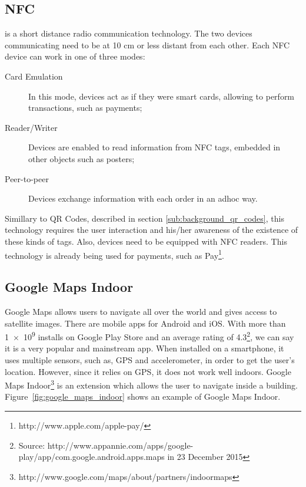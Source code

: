 \subsection{NFC}
\label{sub:background_near_field _communication}
 is a short distance radio communication technology.
The two devices communicating need to be at 10 cm or less distant from each other.
Each \gls{NFC} device can work in one of three modes:
\begin{description}
  \item[Card Emulation] In this mode, devices act as if they were smart cards, allowing to perform transactions, such as payments;
  \item[Reader/Writer] Devices are enabled to read information from \gls{NFC} tags, embedded in other objects such as posters;
  \item[Peer-to-peer] Devices exchange information with each order in an adhoc way.
\end{description}

Simillary to \gls{QR} Codes, described in section \ref{sub:background_qr_codes}, this technology requires the user interaction and his/her awareness of the existence of these kinds of tags.
Also, devices need to be equipped with \gls{NFC} readers.
This technology is already being used for payments, such as  Pay\footnote{http://www.apple.com/apple-pay/}.

\subsection{Google Maps Indoor}
\label{sub:background_google_maps_indoor}
Google Maps allows users to navigate all over the world and gives access to satellite images.
There are mobile apps for Android and iOS.
With more than \num{1e9} installs on Google Play Store and an average rating of 4.3\footnote{Source: http://www.appannie.com/apps/google-play/app/com.google.android.apps.maps in 23 December 2015}, we can say it is a very popular and mainstream app.
When installed on a smartphone, it uses multiple sensors, such as, \gls{GPS} and accelerometer, in order to get the user's location.
However, since it relies on \gls{GPS}, it does not work well indoors.
Google Maps Indoor\footnote{http://www.google.com/maps/about/partners/indoormaps} is an extension which allows the user to navigate inside a building.
Figure~\ref{fig:google_maps_indoor} shows an example of Google Maps Indoor.

